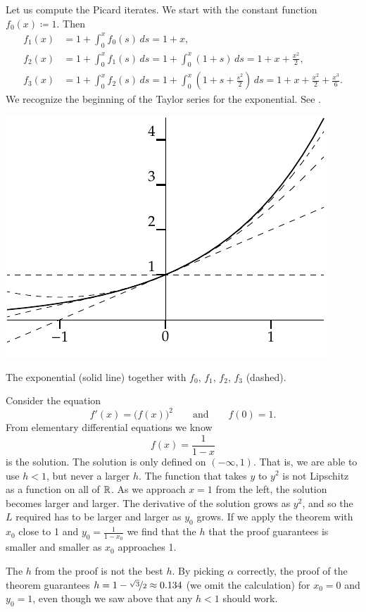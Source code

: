 \begin{example}
Let us compute the Picard iterates.
We start with the constant function $f_0(x) \coloneqq 1$.  Then
\begin{align*}
f_1(x) & = 1 + \int_0^x f_0(s)\,ds =
1+x, \\
f_2(x) & = 1 + \int_0^x f_1(s)\,ds =
1 + \int_0^x (1+s)\,ds = 1 + x + \frac{x^2}{2}, \\
f_3(x) & = 1 + \int_0^x f_2(s)\,ds =
1 + \int_0^x \left(1+ s + \frac{s^2}{2} \right)\,ds =
1 + x + \frac{x^2}{2} + \frac{x^3}{6} .
\end{align*}
We recognize the beginning of the Taylor series for the exponential.
See .
\begin{myfigureht}
\includegraphics{figures/exppicardfig}
\caption{The exponential (solid line) together with $f_0$, $f_1$, $f_2$,
$f_3$ (dashed).\label{fig:exppicard}}
\end{myfigureht}
\end{example}

\begin{example}
Consider the equation
\begin{equation*}
f'(x) = {\bigl(f(x)\bigr)}^2 \qquad \text{and} \qquad f(0)=1.
\end{equation*}
From elementary differential equations we know 
\begin{equation*}
f(x) = \frac{1}{1-x}
\end{equation*}
is the solution.
The solution is only defined on $(-\infty,1)$.  That is,
we are able to use $h < 1$, but never a larger $h$.
The function that takes $y$ to $y^2$ is
not Lipschitz as a function on all of ${\mathbb{R}}$.
As we approach $x=1$ from the left, the solution becomes larger
and larger.  The derivative of the solution grows as $y^2$, and so
the $L$ required has to be larger and larger as $y_0$ grows.
If we apply the
theorem with $x_0$ close to 1 and $y_0 = \frac{1}{1-x_0}$ we find
that the $h$ that the proof guarantees is smaller and smaller as $x_0$
approaches 1.

The $h$ from the proof is not the best $h$.
By picking $\alpha$ correctly, the proof of the theorem guarantees
$h=1-\nicefrac{\sqrt{3}}{2} \approx 0.134$ (we omit the
calculation) for $x_0=0$ and $y_0=1$, even though
we saw above that any $h < 1$ should work.
\end{example}

